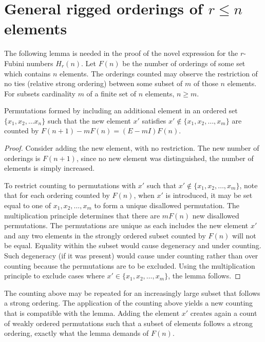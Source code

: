 \documentclass[12pt,reqno]{article}
\begin{document}
\section{General rigged orderings  of $r \leq n$ elements}

The following lemma is needed in the proof of the novel expression for the $r$-Fubini numbers $H_{r}(n)$. Let $F(n)$ be the number of orderings of some set which contains $n$ elements. The orderings counted may observe the restriction of no ties (relative strong ordering) between some subset of $m$ of those $n$ elements. For subsets cardinality $m$ of a finite set of $n$ elements, $n \geq m$.
\begin{lemma}\label{lm:counting}
	Permutations formed by including an additional element in an ordered set $\{x_{1}, x_{2}, \ldots x_{n}\}$ such that the new element $x'$ satisfies $x' \notin \{x_{1}, x_{2}, \ldots, x_{m}\}$  are counted by $F(n + 1) - mF(n) = (E - mI)F(n) $.

	\begin{proof}
		Consider adding the new element, with no restriction. The new number of orderings is $F(n + 1)$, since no new element was distinguished, the number of elements is simply increased.

		To restrict counting to permutations with $x'$ such that $x' \notin \{x_{1}, x_{2}, \ldots, x_{m}\}$, note that for each ordering counted by $F(n)$, when $x'$ is introduced, it may be set equal to one of ${x_{1}, x_{2}, \ldots, x_{m}}$ to form a unique disallowed permutation. The multiplication principle determines that there are $mF(n)$ new disallowed permutations. The permutations are unique as each includes the new element $x'$ and any two elements in the strongly ordered subset counted by $F(n)$ will not be equal. Equality within the subset would cause degeneracy and under counting. Such degeneracy (if it was present) would cause under counting rather than over counting because the permutations are to be excluded. Using the multiplication principle to exclude cases where $x' \in \{x_{1}, x_{2}, \ldots, x_{m}\}$, the lemma follows.
	\end{proof}
\end{lemma}
The counting above may be repeated for an increasingly large subset that follows a strong ordering. The application of the counting above yields a new counting that is compatible with the lemma. Adding the element $x'$ creates again a count of weakly ordered permutations such that a subset of elements follows a strong ordering, exactly what the lemma demands of $F(n)$.
\end{document}
